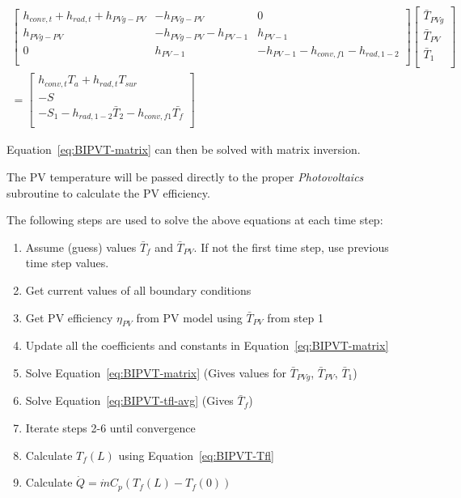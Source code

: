\begin{equation}
\begin{split}
\left[\begin{matrix}h_{conv,t}+h_{rad,t}+h_{PVg-PV}&-h_{PVg-PV}&0\\h_{PVg-PV}&-h_{PVg-PV}-h_{PV-1}&h_{PV-1}\\0&h_{PV-1}&-h_{PV-1}-h_{conv,f1}-h_{rad,1-2}\\\end{matrix}\right]\left[\begin{matrix}{\bar{T}}_{PVg}\\{\bar{T}}_{PV}\\{\bar{T}}_1\\\end{matrix}\right] \\ 
=\left[\begin{matrix}h_{conv,t}T_a+h_{rad,t}T_{sur}\\-S\\-S_1-h_{rad,1-2}{\bar{T}}_2-h_{conv,f1}\bar{T_f}\\\end{matrix}\right]
\end{split}
\label{eq:BIPVT-matrix}
\end{equation}

Equation~\ref{eq:BIPVT-matrix} can then be solved with matrix inversion.

The PV temperature will be passed directly to the proper \emph{Photovoltaics} subroutine to calculate the PV efficiency.

The following steps are used to solve the above equations at each time step:

\begin{enumerate}
	\item Assume (guess) values \(\bar{T}_{f}\) and \(\bar{T}_{PV}\). If not the first time step, use previous time step values.
	\item Get current values of all boundary conditions
	\item Get PV efficiency \(\eta_{PV}\) from PV model using \(\bar{T}_{PV}\) from step 1
	\item Update all the coefficients and constants in Equation~\ref{eq:BIPVT-matrix}
	\item Solve Equation~\ref{eq:BIPVT-matrix} (Gives values for \(\bar{T}_{PVg}\), \(\bar{T}_{PV}\), \(\bar{T}_{1}\))
	\item Solve Equation~\ref{eq:BIPVT-tfl-avg} (Gives \(\bar{T}_{f}\))
	\item Iterate steps 2-6 until convergence
	\item Calculate \(T_{f}(L)\) using Equation~\ref{eq:BIPVT-Tfl}
	\item Calculate \(\dot{Q}=\dot{m}C_{p}\left(T_{f}(L)-T_{f}(0)\right)\)
\end{enumerate}


